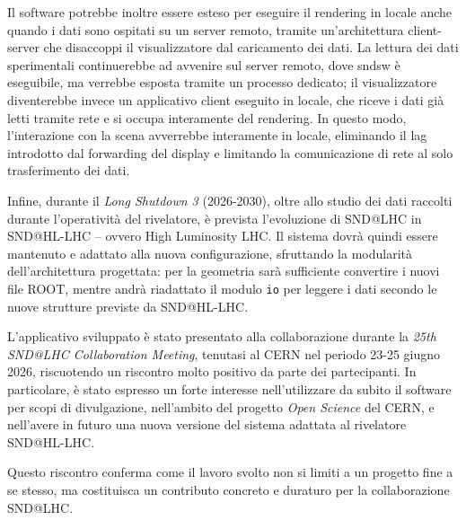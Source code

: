 Il software potrebbe inoltre essere esteso per eseguire il rendering in locale anche quando i dati sono ospitati su un server remoto, tramite un'architettura client-server che disaccoppi il visualizzatore dal caricamento dei dati.
La lettura dei dati sperimentali continuerebbe ad avvenire sul server remoto, dove sndsw è eseguibile, ma verrebbe esposta tramite un processo dedicato; il visualizzatore diventerebbe invece un applicativo client eseguito in locale, che riceve i dati già letti tramite rete e si occupa interamente del rendering.
In questo modo, l'interazione con la scena avverrebbe interamente in locale, eliminando il lag introdotto dal forwarding del display e limitando la comunicazione di rete al solo trasferimento dei dati.

Infine, durante il \emph{Long Shutdown 3} (2026-2030), oltre allo studio dei dati raccolti durante l'operatività del rivelatore, è prevista l'evoluzione di SND@LHC in SND@HL-LHC -- ovvero High Luminosity LHC.
Il sistema dovrà quindi essere mantenuto e adattato alla nuova configurazione, sfruttando la modularità dell'architettura progettata: per la geometria sarà sufficiente convertire i nuovi file ROOT, mentre andrà riadattato il modulo \texttt{io} per leggere i dati secondo le nuove strutture previste da SND@HL-LHC.

\medskip
{}
L'applicativo sviluppato è stato presentato alla collaborazione durante la \emph{25th SND@LHC Collaboration Meeting}, tenutasi al CERN nel periodo 23-25 giugno 2026, riscuotendo un riscontro molto positivo da parte dei partecipanti.
In particolare, è stato espresso un forte interesse nell'utilizzare da subito il software per scopi di divulgazione, nell'ambito del progetto \emph{Open Science} del CERN, e nell'avere in futuro una nuova versione del sistema adattata al rivelatore SND@HL-LHC.

Questo riscontro conferma come il lavoro svolto non si limiti a un progetto fine a se stesso, ma costituisca un contributo concreto e duraturo per la collaborazione SND@LHC.